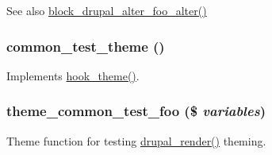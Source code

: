 \begin{DoxySeeAlso}{See also}
\hyperlink{common__test_8module_a0ea8b96fa8bf0e390240e4a010208ec9}{block\_\-drupal\_\-alter\_\-foo\_\-alter()} 
\end{DoxySeeAlso}
\hypertarget{common__test_8module_a51c6df449100ce19786976b207953706}{
\subsubsection[{common\_\-test\_\-theme}]{\setlength{\rightskip}{0pt plus 5cm}common\_\-test\_\-theme ()}}
\label{common__test_8module_a51c6df449100ce19786976b207953706}
Implements \hyperlink{group__hooks_ga013ccb45c7aaab1c16cf9691428c910d}{hook\_\-theme()}. \hypertarget{common__test_8module_a887af90f11eb1a98dd3ce095da8725ca}{
\subsubsection[{theme\_\-common\_\-test\_\-foo}]{\setlength{\rightskip}{0pt plus 5cm}theme\_\-common\_\-test\_\-foo (\$ {\em variables})}}
\label{common__test_8module_a887af90f11eb1a98dd3ce095da8725ca}
Theme function for testing \hyperlink{common_8inc_a05798b44e8d6c496d4bee5cc32fa7851}{drupal\_\-render()} theming. 